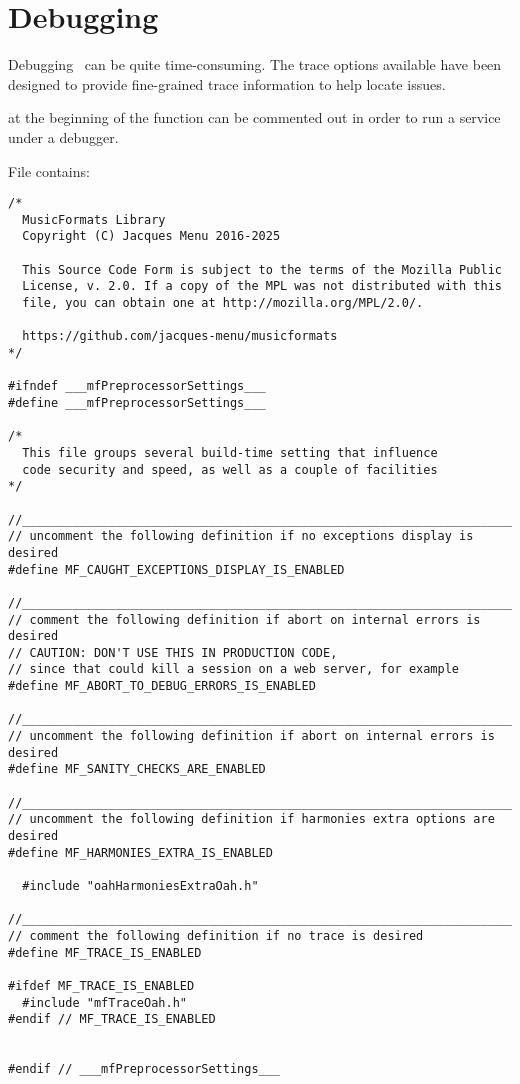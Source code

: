 

\chapter{Debugging}

Debugging \mf\ can be quite time-consuming. The trace options available have been designed to provide fine-grained trace information to help locate issues.

 at the beginning of the  function can be commented out in order to run a service under a debugger.

File  contains:
\begin{lstlisting}[language=CPlusPlus]
/*
  MusicFormats Library
  Copyright (C) Jacques Menu 2016-2025

  This Source Code Form is subject to the terms of the Mozilla Public
  License, v. 2.0. If a copy of the MPL was not distributed with this
  file, you can obtain one at http://mozilla.org/MPL/2.0/.

  https://github.com/jacques-menu/musicformats
*/

#ifndef ___mfPreprocessorSettings___
#define ___mfPreprocessorSettings___

/*
  This file groups several build-time setting that influence
  code security and speed, as well as a couple of facilities
*/

//______________________________________________________________________________
// uncomment the following definition if no exceptions display is desired
#define MF_CAUGHT_EXCEPTIONS_DISPLAY_IS_ENABLED

//______________________________________________________________________________
// comment the following definition if abort on internal errors is desired
// CAUTION: DON'T USE THIS IN PRODUCTION CODE,
// since that could kill a session on a web server, for example
#define MF_ABORT_TO_DEBUG_ERRORS_IS_ENABLED

//______________________________________________________________________________
// uncomment the following definition if abort on internal errors is desired
#define MF_SANITY_CHECKS_ARE_ENABLED

//______________________________________________________________________________
// uncomment the following definition if harmonies extra options are desired
#define MF_HARMONIES_EXTRA_IS_ENABLED

  #include "oahHarmoniesExtraOah.h"

//______________________________________________________________________________
// comment the following definition if no trace is desired
#define MF_TRACE_IS_ENABLED

#ifdef MF_TRACE_IS_ENABLED
  #include "mfTraceOah.h"
#endif // MF_TRACE_IS_ENABLED


#endif // ___mfPreprocessorSettings___
\end{lstlisting}


